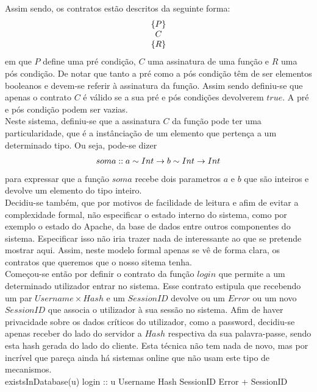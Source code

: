 Assim sendo, os contratos estão descritos da seguinte forma:
$$\noindent\begin{array}{c} \{P\} \\ C \\ \{R\} \\ \end{array}$$
em que $P$ define uma pré condição, $C$ uma assinatura de uma função e $R$ uma pós condição.
De notar que tanto a pré como a pós condição têm de ser elementos booleanos e devem-se referir à assinatura da função. Assim sendo definiu-se que apenas o contrato $C$
é válido se a sua pré e pós condições devolverem $true$. A pré e pós condição podem ser vazias.\\

Neste sistema, definiu-se que a assinatura $C$ da função pode ter uma particularidade, que é a instânciação de um elemento que pertença a um determinado tipo.
Ou seja, pode-se dizer $$soma :: a \sim Int \rightarrow b \sim Int \rightarrow Int$$ para expressar que a função $soma$ recebe dois parametros $a$ e $b$ que são inteiros e devolve
um elemento do tipo inteiro.\\

Decidiu-se também, que por motivos de facilidade de leitura e afim de evitar a complexidade formal, não especificar o estado interno do sistema, como por exemplo o estado do Apache,
da base de dados entre outros componentes do sistema. Especificar isso não iria trazer nada de interessante ao que se pretende mostrar aqui.
Assim, neste modelo formal apenas se vê de forma clara, os contratos que queremos que o nosso sitema tenha.\\

Começou-se então por definir o contrato da função $login$ que permite a um determinado utilizador entrar no sistema. Esse contrato estipula que recebendo um par
$Username \times Hash$ e um $SessionID$ devolve ou um $Error$ ou um novo $SessionID$ que associa o utilizador à sua sessão no sistema. Afim de haver privacidade
sobre os dados críticos do utilizador, como a password, decidiu-se apenas receber do lado do servidor a $Hash$ respectiva da sua palavra-passe, sendo esta hash
gerada do lado do cliente. Esta técnica não tem nada de novo, mas por incrível que pareça ainda há sistemas online que não usam este tipo de mecanismos.\\

\prop
{existsInDatabase(u)}
{login :: u \unif Username \times Hash \rarrow SessionID \rarrow Error + SessionID}
{ }


